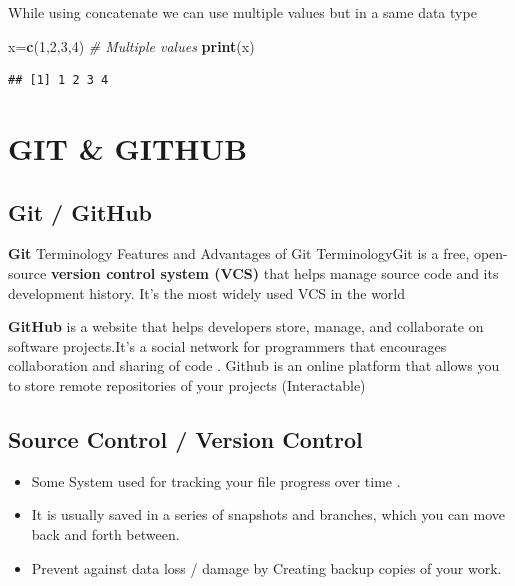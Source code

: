 \documentclass[
]{article}
\newenvironment{Shaded}{\begin{snugshade}}{\end{snugshade}}
\newcommand{\CommentTok}[1]{\textcolor[rgb]{0.56,0.35,0.01}{\textit{#1}}}
\newcommand{\DecValTok}[1]{\textcolor[rgb]{0.00,0.00,0.81}{#1}}
\newcommand{\FunctionTok}[1]{\textcolor[rgb]{0.13,0.29,0.53}{\textbf{#1}}}
\newcommand{\NormalTok}[1]{#1}
\newcommand{\OtherTok}[1]{\textcolor[rgb]{0.56,0.35,0.01}{#1}}
\providecommand{\tightlist}{%
  \setlength{\itemsep}{0pt}\setlength{\parskip}{0pt}}
\begin{document}
While using concatenate we can use multiple values but in a same data
type

\begin{Shaded}
\begin{Highlighting}[]
\NormalTok{ x}\OtherTok{=}\FunctionTok{c}\NormalTok{(}\DecValTok{1}\NormalTok{,}\DecValTok{2}\NormalTok{,}\DecValTok{3}\NormalTok{,}\DecValTok{4}\NormalTok{) }\CommentTok{\# Multiple values}
\FunctionTok{print}\NormalTok{(x)}
\end{Highlighting}
\end{Shaded}

\begin{verbatim}
## [1] 1 2 3 4
\end{verbatim}

\newpage

\section{GIT \& GITHUB}\label{git-github}

\subsection{Git / GitHub}\label{git-github-1}

\textbf{Git} Terminology Features and Advantages of Git TerminologyGit
is a free, open-source \textbf{version control system (VCS)} that helps
manage source code and its development history. It's the most widely
used VCS in the world

\textbf{GitHub} is a website that helps developers store, manage, and
collaborate on software projects.It's a social network for programmers
that encourages collaboration and sharing of code . Github is an online
platform that allows you to store remote repositories of your projects
(Interactable)

\subsection{Source Control / Version
Control}\label{source-control-version-control}

\begin{itemize}
\tightlist
\item
  Some System used for tracking your file progress over time .
\item
  It is usually saved in a series of snapshots and branches, which you
  can move back and forth between.
\item
  Prevent against data loss / damage by Creating backup copies of your
  work.
\end{itemize}
\end{document}
